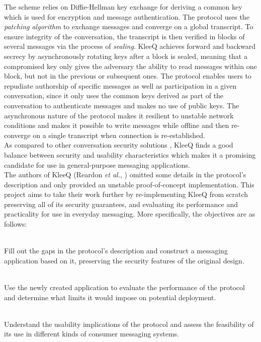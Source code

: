 \documentclass[a4paper, 12pt]{report}
\begin{document}
The scheme relies on Diffie-Hellman key exchange for deriving a common key which is used for encryption and message authentication. The protocol uses the \emph{patching algorithm} to exchange messages and converge on a global transcript. To ensure integrity of the conversation, the transcript is then verified in blocks of several messages via the process of \emph{sealing}. KleeQ achieves forward and backward secrecy by asynchronously rotating keys after a block is sealed, meaning that a compromised key only gives the adversary the ability to read messages within one block, but not in the previous or subsequent ones. The protocol enables users to repudiate authorship of specific messages as well as participation in a given conversation, since it only uses the common keys derived as part of the conversation to authenticate messages and makes no use of public keys. The asynchronous nature of the protocol makes it resilient to unstable network conditions and makes it possible to write messages while offline and then re-converge on a single transcript when connection is re-established. \\

As compared to other conversation security solutions \cite{unger2015sok}, KleeQ finds a good balance between security and usability characteristics which makes it a promising candidate for use in general-purpose messaging applications. \\

The authors of KleeQ (Reardon \textit{et al.}, \cite{reardon2007kleeq}) omitted some details in the protocol's description and only provided an unstable proof-of-concept implementation. This project aims to take their work further by re-implementing KleeQ from scratch preserving all of its security guarantees, and evaluating its performance and practicality for use in everyday messaging. More specifically, the objectives are as follows:

\begin{description}[labelindent=0.5cm, leftmargin=1.3cm, rightmargin=0.5cm]
    \item[Implementation] \hfill \\
        Fill out the gaps in the protocol's description and construct a messaging application based on it, preserving the security features of the original design.
        
    \item[Evaluation of Performance] \hfill \\
        Use the newly created application to evaluate the performance of the protocol and determine what limits it would impose on potential deployment.
        
    \item[Evaluation of Usability] \hfill \\
        Understand the usability implications of the protocol and assess the feasibility of its use in different kinds of consumer messaging systems.

\end{description}
\end{document}

